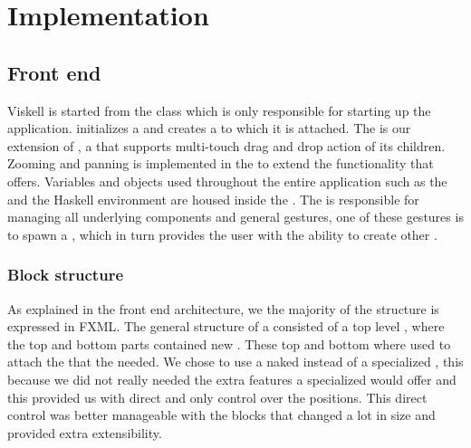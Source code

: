 \chapter{Implementation}
\label{chap:implementation}

\section{Front end}
Viskell is started from the  class which is only responsible for starting up the application.  initializes a  and creates a  to which it is attached. The  is our extension of , a  that supports multi-touch drag and drop action of its children. Zooming and panning is implemented in the  to extend the functionality that  offers. Variables and objects used throughout the entire application such as the  and the Haskell environment are housed inside the . The  is responsible for managing all underlying components and general gestures, one of these gestures is to spawn a , which in turn provides the user with the ability to create other .

\subsection{Block structure}
As explained in the front end architecture, we the majority of the  structure is expressed in \gls{FXML}. The general structure of a  consisted of a top level , where the top and bottom parts contained new . These top and bottom  where used to attach the  that the  needed. We chose to use a naked  instead of a specialized , this because we did not really needed the extra features a specialized  would offer and this provided us with direct and only control over the  positions. This direct control was better manageable with the blocks that changed a lot in size and provided extra extensibility.

